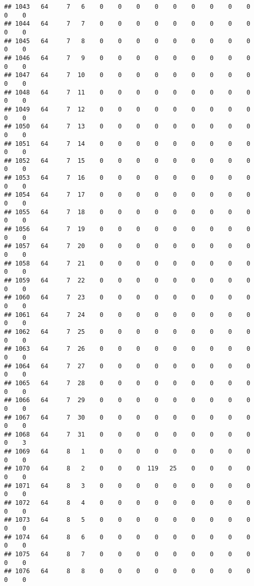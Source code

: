\documentclass[]{article}
\begin{document}
\begin{verbatim}
## 1043   64     7   6    0    0    0    0    0    0    0    0    0    0    0
## 1044   64     7   7    0    0    0    0    0    0    0    0    0    0    0
## 1045   64     7   8    0    0    0    0    0    0    0    0    0    0    0
## 1046   64     7   9    0    0    0    0    0    0    0    0    0    0    0
## 1047   64     7  10    0    0    0    0    0    0    0    0    0    0    0
## 1048   64     7  11    0    0    0    0    0    0    0    0    0    0    0
## 1049   64     7  12    0    0    0    0    0    0    0    0    0    0    0
## 1050   64     7  13    0    0    0    0    0    0    0    0    0    0    0
## 1051   64     7  14    0    0    0    0    0    0    0    0    0    0    0
## 1052   64     7  15    0    0    0    0    0    0    0    0    0    0    0
## 1053   64     7  16    0    0    0    0    0    0    0    0    0    0    0
## 1054   64     7  17    0    0    0    0    0    0    0    0    0    0    0
## 1055   64     7  18    0    0    0    0    0    0    0    0    0    0    0
## 1056   64     7  19    0    0    0    0    0    0    0    0    0    0    0
## 1057   64     7  20    0    0    0    0    0    0    0    0    0    0    0
## 1058   64     7  21    0    0    0    0    0    0    0    0    0    0    0
## 1059   64     7  22    0    0    0    0    0    0    0    0    0    0    0
## 1060   64     7  23    0    0    0    0    0    0    0    0    0    0    0
## 1061   64     7  24    0    0    0    0    0    0    0    0    0    0    0
## 1062   64     7  25    0    0    0    0    0    0    0    0    0    0    0
## 1063   64     7  26    0    0    0    0    0    0    0    0    0    0    0
## 1064   64     7  27    0    0    0    0    0    0    0    0    0    0    0
## 1065   64     7  28    0    0    0    0    0    0    0    0    0    0    0
## 1066   64     7  29    0    0    0    0    0    0    0    0    0    0    0
## 1067   64     7  30    0    0    0    0    0    0    0    0    0    0    0
## 1068   64     7  31    0    0    0    0    0    0    0    0    0    0    3
## 1069   64     8   1    0    0    0    0    0    0    0    0    0    0    0
## 1070   64     8   2    0    0    0  119   25    0    0    0    0    0    0
## 1071   64     8   3    0    0    0    0    0    0    0    0    0    0    0
## 1072   64     8   4    0    0    0    0    0    0    0    0    0    0    0
## 1073   64     8   5    0    0    0    0    0    0    0    0    0    0    0
## 1074   64     8   6    0    0    0    0    0    0    0    0    0    0    0
## 1075   64     8   7    0    0    0    0    0    0    0    0    0    0    0
## 1076   64     8   8    0    0    0    0    0    0    0    0    0    0    0

\end{verbatim}
\end{document}
